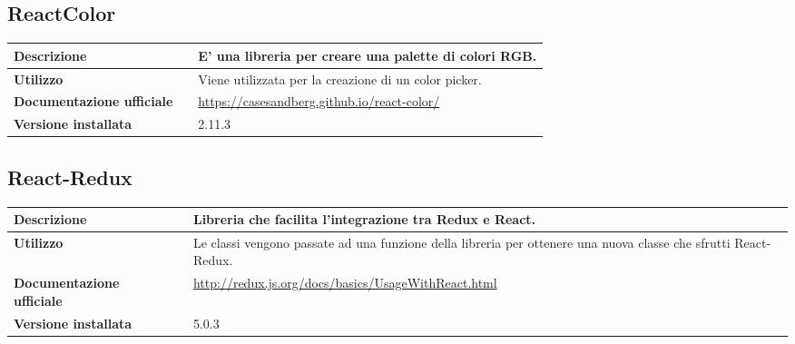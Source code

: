 \vspace{40px}
\subsection{ReactColor}
\label{ReactColor}
\begin{table}[H]
	\centering
	\begin{tabular}{p{2cm}p{0.5cm}p{11.5cm}}
		\arrayrulecolor{lightgray}
		\toprule
		\textbf{Descrizione} & &
		E' una libreria \js{} per creare una palette di colori RGB.
		\\ \midrule
		\textbf{Utilizzo} & &
		Viene  utilizzata per la creazione di un color picker.
		\\ \midrule
		\textbf{Documentazione ufficiale} & &
		\url{https://casesandberg.github.io/react-color/}
		\\ \midrule
		\textbf{Versione installata} & &
		2.11.3
		\\ \bottomrule
	\end{tabular}
\end{table}

\vspace{40px}
\subsection{React-Redux}
\label{React-Redux}
\begin{table}[H]
	\centering
	\begin{tabular}{p{2cm}p{0.5cm}p{11.5cm}}
		\arrayrulecolor{lightgray}
		\toprule
		\textbf{Descrizione} & &
		Libreria che facilita l'integrazione tra Redux e React.
		\\ \midrule
		\textbf{Utilizzo} & &
		Le classi \js{} vengono passate ad una funzione della libreria per ottenere una nuova classe che sfrutti React-Redux.
		\\ \midrule
		\textbf{Documentazione ufficiale} & &
		\url{http://redux.js.org/docs/basics/UsageWithReact.html}
		\\ \midrule
		\textbf{Versione installata} & &
		5.0.3
		\\ \bottomrule
	\end{tabular}
\end{table}

\vspace{40px}

